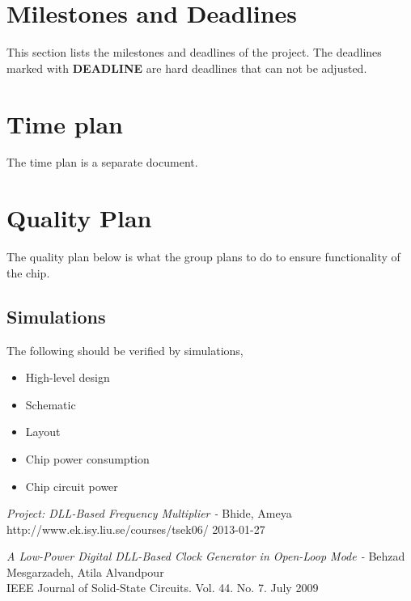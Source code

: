 \documentclass[a4paper,12pt]{article} \usepackage{graphicx}
\begin{document}
\section{Milestones and Deadlines}
This section lists the milestones and deadlines of the project.
The deadlines marked with \textbf{DEADLINE} are hard 
deadlines that can not be adjusted.

\begin{LIPSdeadlines}
\end{LIPSdeadlines}

\section{Time plan}
The time plan is a separate document.

\section{Quality Plan} 
The quality plan below is what the group plans to do to ensure functionality of the chip. 
\subsection{Simulations} 
The following should be verified by simulations,

\begin{itemize}
\item High-level design
\item Schematic
\item Layout
\item Chip power consumption
\item Chip circuit power
\end{itemize}

\newpage 
\appendix 
\newpage


\begin{thebibliography}{99}
\textit{Project: DLL-Based Frequency Multiplier - } Bhide,
Ameya
\\ http://www.ek.isy.liu.se/courses/tsek06/ 2013-01-27

\textit{A Low-Power Digital DLL-Based Clock Generator in Open-Loop Mode - }
Behzad Mesgarzadeh, Atila Alvandpour \\
IEEE Journal of Solid-State Circuits. Vol. 44. No. 7. July 2009

\end{thebibliography}
\end{document}
